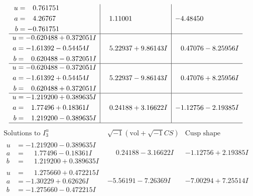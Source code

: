 \documentclass[1p]{elsarticle_modified}
\theoremstyle{definition}
\newcommand{\I}{\sqrt{-1}}
\begin{document}
$$\begin{array}{c|c|c}
\begin{aligned}
u &= \phantom{-}0.761751\phantom{ +0.000000I} \\
a &= \phantom{-}4.26767\phantom{ +0.000000I} \\
b &= -0.761751\phantom{ +0.000000I}\end{aligned}
 & \phantom{-}1.11001\phantom{ +0.000000I} & -4.48450\phantom{ +0.000000I} \\ \hline\begin{aligned}
u &= -0.620488 + 0.372051 I \\
a &= -1.61392 - 0.54454 I \\
b &= \phantom{-}0.620488 - 0.372051 I\end{aligned}
 & \phantom{-}5.22937 + 9.86143 I & \phantom{-}0.47076 - 8.25956 I \\ \hline\begin{aligned}
u &= -0.620488 - 0.372051 I \\
a &= -1.61392 + 0.54454 I \\
b &= \phantom{-}0.620488 + 0.372051 I\end{aligned}
 & \phantom{-}5.22937 - 9.86143 I & \phantom{-}0.47076 + 8.25956 I \\ \hline\begin{aligned}
u &= -1.219200 + 0.389635 I \\
a &= \phantom{-}1.77496 + 0.18361 I \\
b &= \phantom{-}1.219200 - 0.389635 I\end{aligned}
 & \phantom{-}0.24188 + 3.16622 I & -1.12756 - 2.19385 I\\
 \hline 
 \end{array}$$\newpage$$\begin{array}{c|c|c}  
\text{Solutions to }I^u_{3}& \I (\text{vol} + \sqrt{-1}CS) & \text{Cusp shape}\\
 \hline 
\begin{aligned}
u &= -1.219200 - 0.389635 I \\
a &= \phantom{-}1.77496 - 0.18361 I \\
b &= \phantom{-}1.219200 + 0.389635 I\end{aligned}
 & \phantom{-}0.24188 - 3.16622 I & -1.12756 + 2.19385 I \\ \hline\begin{aligned}
u &= \phantom{-}1.275660 + 0.472215 I \\
a &= -1.30229 + 0.62626 I \\
b &= -1.275660 - 0.472215 I\end{aligned}
 & -5.56191 - 7.26369 I & -7.00294 + 7.25514 I \\ \hline\begin{aligned}

\end{aligned}
\end{array}$$
\end{document}
